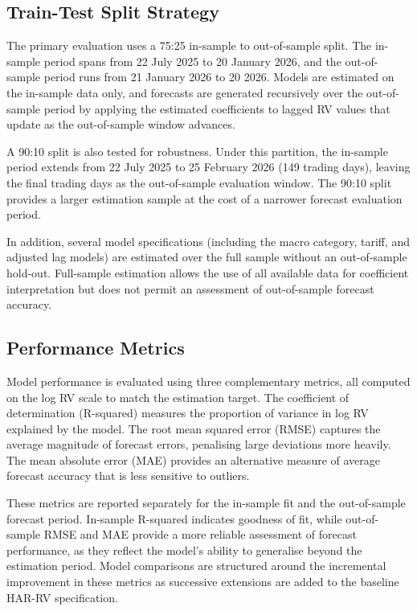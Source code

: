 \documentclass[12pt,a4paper]{report}
\begin{document}
\subsection{Train-Test Split Strategy}
The primary evaluation uses a 75:25 in-sample to out-of-sample split. The in-sample period spans from 22 July 2025 to 20 January 2026, and the out-of-sample period runs from 21 January 2026 to 20 2026. Models are estimated on the in-sample data only, and forecasts are generated recursively over the out-of-sample period by applying the estimated coefficients to lagged RV values that update as the out-of-sample window advances.

A 90:10 split is also tested for robustness. Under this partition, the in-sample period extends from 22 July 2025 to 25 February 2026 (149 trading days), leaving the final trading days as the out-of-sample evaluation window. The 90:10 split provides a larger estimation sample at the cost of a narrower forecast evaluation period.

In addition, several model specifications (including the macro category, tariff, and adjusted lag models) are estimated over the full sample without an out-of-sample hold-out. Full-sample estimation allows the use of all available data for coefficient interpretation but does not permit an assessment of out-of-sample forecast accuracy.

\subsection{Performance Metrics}
Model performance is evaluated using three complementary metrics, all computed on the log RV scale to match the estimation target. The coefficient of determination (R-squared) measures the proportion of variance in log RV explained by the model. The root mean squared error (RMSE) captures the average magnitude of forecast errors, penalising large deviations more heavily. The mean absolute error (MAE) provides an alternative measure of average forecast accuracy that is less sensitive to outliers.

These metrics are reported separately for the in-sample fit and the out-of-sample forecast period. In-sample R-squared indicates goodness of fit, while out-of-sample RMSE and MAE provide a more reliable assessment of forecast performance, as they reflect the model's ability to generalise beyond the estimation period. Model comparisons are structured around the incremental improvement in these metrics as successive extensions are added to the baseline HAR-RV specification.
\end{document}

